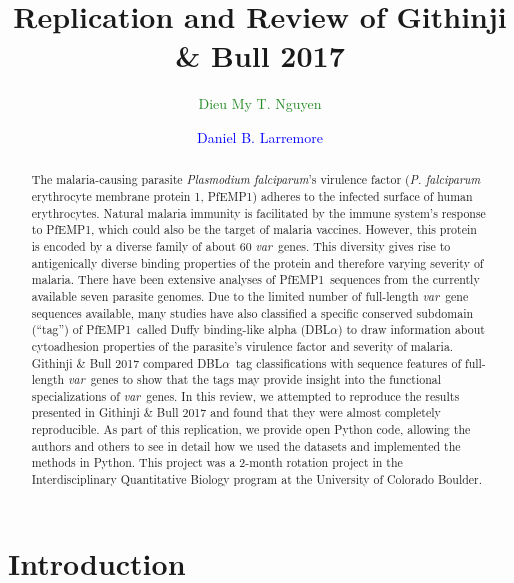 \documentclass[10pt,twocolumn,superscriptaddress]{revtex4-1}
\newcommand{\dieumy}[1]{\textcolor{ForestGreen}{#1}}
\newcommand{\dan}[1]{\textcolor{blue}{#1}}
\newcommand{\var}{{\it var}\xspace}
\newcommand{\pf}{{\it P. falciparum}\xspace}
\newcommand{\pfem}{{PfEMP1}\xspace}
\newcommand{\dbla}{{DBL$\alpha$}\xspace}
\newcommand{\paper}{{Githinji \& Bull}\xspace}
\begin{document}
\author{\dieumy{Dieu My T. Nguyen}}
\author{\dan{Daniel B. Larremore}}
	

\title{Replication and Review of \paper 2017}
\begin{abstract}
The malaria-causing parasite \textit{Plasmodium falciparum}'s virulence factor (\pf erythrocyte membrane protein 1, \pfem) adheres to the infected surface of human erythrocytes. Natural malaria immunity is facilitated by the immune system's response to \pfem, which could also be the target of malaria vaccines. However, this protein is encoded by a diverse family of about 60 \var\ genes. This diversity gives rise to antigenically diverse binding properties of the protein and therefore varying severity of malaria. There have been extensive analyses of \pfem\ sequences from the currently available seven parasite genomes. Due to the limited number of full-length \var\ gene sequences available, many studies have also classified a specific conserved subdomain (``tag'') of \pfem\ called Duffy binding-like alpha (\dbla) to draw information about cytoadhesion properties of the parasite's virulence factor and severity of malaria. \paper 2017 compared \dbla\ tag classifications with sequence features of full-length \var\ genes to show that the tags may provide insight into the functional specializations of \var\ genes. In this review, we attempted to reproduce the results presented in \paper 2017 and found that they were almost completely reproducible. As part of this replication, we provide open Python code, allowing the authors and others to see in detail how we used the datasets and implemented the methods in Python. This project was a 2-month rotation project in the Interdisciplinary Quantitative Biology program at the University of Colorado Boulder.  
\end{abstract}
\maketitle


\section{Introduction} 
\end{document}
